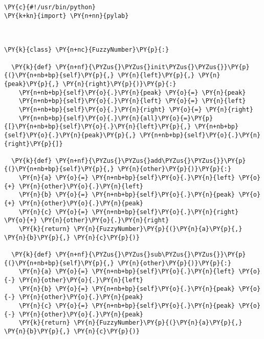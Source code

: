 \begin{Verbatim}[commandchars=\\\{\}]
\PY{c}{#!/usr/bin/python}
\PY{k+kn}{import} \PY{n+nn}{pylab}



\PY{k}{class} \PY{n+nc}{FuzzyNumber}\PY{p}{:}

  \PY{k}{def} \PY{n+nf}{\PYZus{}\PYZus{}init\PYZus{}\PYZus{}}\PY{p}{(}\PY{n+nb+bp}{self}\PY{p}{,} \PY{n}{left}\PY{p}{,} \PY{n}{peak}\PY{p}{,} \PY{n}{right}\PY{p}{)}\PY{p}{:}
    \PY{n+nb+bp}{self}\PY{o}{.}\PY{n}{peak} \PY{o}{=} \PY{n}{peak}
    \PY{n+nb+bp}{self}\PY{o}{.}\PY{n}{left} \PY{o}{=} \PY{n}{left}
    \PY{n+nb+bp}{self}\PY{o}{.}\PY{n}{right} \PY{o}{=} \PY{n}{right}
    \PY{n+nb+bp}{self}\PY{o}{.}\PY{n}{all}\PY{o}{=}\PY{p}{[}\PY{n+nb+bp}{self}\PY{o}{.}\PY{n}{left}\PY{p}{,} \PY{n+nb+bp}{self}\PY{o}{.}\PY{n}{peak}\PY{p}{,} \PY{n+nb+bp}{self}\PY{o}{.}\PY{n}{right}\PY{p}{]}

  \PY{k}{def} \PY{n+nf}{\PYZus{}\PYZus{}add\PYZus{}\PYZus{}}\PY{p}{(}\PY{n+nb+bp}{self}\PY{p}{,} \PY{n}{other}\PY{p}{)}\PY{p}{:}
    \PY{n}{a} \PY{o}{=} \PY{n+nb+bp}{self}\PY{o}{.}\PY{n}{left} \PY{o}{+} \PY{n}{other}\PY{o}{.}\PY{n}{left}
    \PY{n}{b} \PY{o}{=} \PY{n+nb+bp}{self}\PY{o}{.}\PY{n}{peak} \PY{o}{+} \PY{n}{other}\PY{o}{.}\PY{n}{peak}
    \PY{n}{c} \PY{o}{=} \PY{n+nb+bp}{self}\PY{o}{.}\PY{n}{right} \PY{o}{+} \PY{n}{other}\PY{o}{.}\PY{n}{right}
    \PY{k}{return} \PY{n}{FuzzyNumber}\PY{p}{(}\PY{n}{a}\PY{p}{,} \PY{n}{b}\PY{p}{,} \PY{n}{c}\PY{p}{)}

  \PY{k}{def} \PY{n+nf}{\PYZus{}\PYZus{}sub\PYZus{}\PYZus{}}\PY{p}{(}\PY{n+nb+bp}{self}\PY{p}{,} \PY{n}{other}\PY{p}{)}\PY{p}{:}
    \PY{n}{a} \PY{o}{=} \PY{n+nb+bp}{self}\PY{o}{.}\PY{n}{left} \PY{o}{-} \PY{n}{other}\PY{o}{.}\PY{n}{left}
    \PY{n}{b} \PY{o}{=} \PY{n+nb+bp}{self}\PY{o}{.}\PY{n}{peak} \PY{o}{-} \PY{n}{other}\PY{o}{.}\PY{n}{peak}
    \PY{n}{c} \PY{o}{=} \PY{n+nb+bp}{self}\PY{o}{.}\PY{n}{peak} \PY{o}{-} \PY{n}{other}\PY{o}{.}\PY{n}{peak}
    \PY{k}{return} \PY{n}{FuzzyNumber}\PY{p}{(}\PY{n}{a}\PY{p}{,} \PY{n}{b}\PY{p}{,} \PY{n}{c}\PY{p}{)}


\end{Verbatim}

